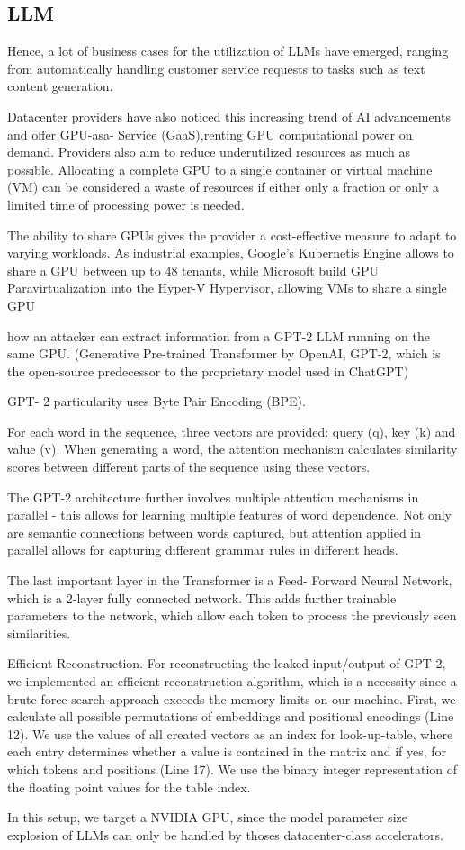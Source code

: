 \subsection{LLM}


Hence, a lot of business cases for the utilization of
LLMs have emerged, ranging from automatically handling
customer service requests to tasks such as text content
generation.


Datacenter providers have also noticed this
increasing trend of AI advancements and offer GPU-asa-
Service (GaaS),renting GPU computational power
on demand.
Providers also aim to reduce underutilized
resources as much as possible. Allocating a complete GPU
to a single container or virtual machine (VM) can be
considered a waste of resources if either only a fraction
or only a limited time of processing power is needed.

The
ability to share GPUs gives the provider a cost-effective
measure to adapt to varying workloads. As industrial
examples, Google's Kubernetis Engine allows to share
a GPU between up to 48 tenants, while Microsoft build
GPU Paravirtualization into the Hyper-V Hypervisor, allowing
VMs to share a single GPU


 how an attacker can extract
information from a GPT-2 LLM running on the same
GPU. 
(Generative Pre-trained Transformer
by OpenAI, GPT-2, which is the open-source predecessor
to the proprietary model used in ChatGPT)

GPT-
2 particularity uses Byte Pair Encoding (BPE).

For each word in the sequence, three vectors
are provided: query (q), key (k) and value (v). When
generating a word, the attention mechanism calculates
similarity scores between different parts of the sequence
using these vectors.

The GPT-2 architecture further involves multiple
attention mechanisms in parallel - this allows for learning
multiple features of word dependence. Not only are semantic
connections between words captured, but attention
applied in parallel allows for capturing different grammar
rules in different heads.

The last important layer in the Transformer is a Feed-
Forward Neural Network, which is a 2-layer fully connected
network. This adds further trainable parameters
to the network, which allow each token to process the
previously seen similarities.

Efficient Reconstruction. For reconstructing the
leaked input/output of GPT-2, we implemented an
efficient reconstruction algorithm, which is a necessity
since a brute-force search approach exceeds the memory
limits on our machine. First, we calculate all possible
permutations of embeddings and positional encodings
(Line 12). We use the values of all created vectors as
an index for look-up-table, where each entry determines
whether a value is contained in the matrix and if yes,
for which tokens and positions (Line 17). We use
the binary integer representation of the floating point
values for the table index.

In this setup, we target a NVIDIA GPU, since
the model parameter size explosion of LLMs can only
be handled by thoses datacenter-class accelerators.